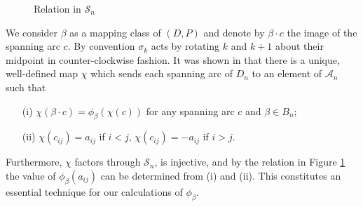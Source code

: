 \documentclass[11pt]{amsart}
\def\A{{\mathcal A}}
\def\s{{\sigma}}
\theoremstyle{definition}
\begin{document}
  \begin{figure}[ht]
\caption{Relation in $\mathscr S_n$}
\label{FigRelnPathAlg}
  \end{figure}

We consider $\beta$ as a mapping class of $(D,P)$ and denote by $\beta\cdot c$ the image of the spanning arc $c$. By convention $\s_k$ acts by rotating $k$ and $k+1$ about their midpoint in counter-clockwise fashion. It was shown in \cite[Section 2]{Ng05b} that there is a unique, well-defined map $\chi$ which sends each spanning arc of $D_n$ to an element of $\A_n$ such that 
    \begin{itemize}
      \item[(i)] $\chi(\beta\cdot c) = \phi_{\beta}(\chi(c))$ for any spanning arc $c$ and $\beta\in B_n$;
      \item[(ii)] $\chi(c_{ij})=a_{ij}$ if $i<j$, $\chi(c_{ij})=-a_{ij}$ if $i>j$.
    \end{itemize}
Furthermore, $\chi$ factors through $\mathscr S_n$, is injective, and by the relation in Figure \ref{FigRelnPathAlg} the value of $\phi_{\beta}(a_{ij})$ can be determined from (i) and (ii). This constitutes an essential technique for our calculations of $\phi_\beta$.
\end{document}
